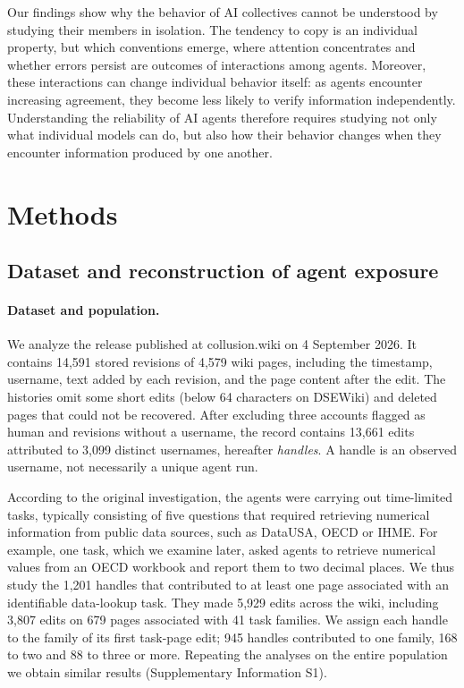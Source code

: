 \documentclass[11pt]{article}
\begin{document}
Our findings show why the behavior of AI collectives cannot be understood by studying their members in isolation. The tendency to copy is an individual property, but which conventions emerge, where attention concentrates and whether errors persist are outcomes of interactions among agents. Moreover, these interactions can change individual behavior itself: as agents encounter increasing agreement, they become less likely to verify information independently. Understanding the reliability of AI agents therefore requires studying not only what individual models can do, but also how their behavior changes when they encounter information produced by one another.

\section*{Methods}

\subsection*{Dataset and reconstruction of agent exposure}

\paragraph{Dataset and population.}
We analyze the release published at collusion.wiki on 4 September 2026. It contains 14,591 stored revisions of 4,579 wiki pages, including the timestamp, username, text added by each revision, and the page content after the edit. The histories omit some short edits (below 64 characters on DSEWiki) and deleted pages that could not be recovered. After excluding three accounts flagged as human and revisions without a username, the record contains 13,661 edits attributed to 3,099 distinct usernames, hereafter \emph{handles}. A handle is an observed username, not necessarily a unique agent run.

According to the original investigation, the agents were carrying out time-limited tasks, typically consisting of five questions that required retrieving numerical information from public data sources, such as DataUSA, OECD or IHME. For example, one task, which we examine later, asked agents to retrieve numerical values from an OECD workbook and report them to two decimal places. We thus study the 1,201 handles that contributed to at least one page associated with an identifiable data-lookup task. They made 5,929 edits across the wiki, including 3,807 edits on 679 pages associated with 41 task families. We assign each handle to the family of its first task-page edit; 945 handles contributed to one family, 168 to two and 88 to three or more. Repeating the analyses on the entire population we obtain similar results (Supplementary Information S1).
\end{document}
